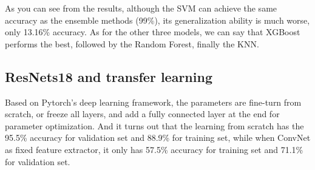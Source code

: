 \documentclass[11pt]{article}
\begin{document}
\begin{table}[h]
\centering
{}
\caption{Four models comparison}
\end{table}

As you can see from the results, although the SVM can achieve the same accuracy as the ensemble methods (99\%), its generalization ability is much worse, only 13.16\% accuracy. As for the other three models, we can say that XGBoost performs the best, followed by the Random Forest, finally the KNN. 
    
\subsection{ResNets18 and transfer learning}
Based on Pytorch's deep learning framework, the parameters are fine-turn from scratch, or freeze all layers, and add a fully connected layer at the end for parameter optimization. And it turns out that the learning from scratch has the 95.5\% accuracy for validation set and 88.9\% for training set, while when ConvNet as fixed feature extractor, it only has 57.5\% accuracy for training set and 71.1\% for validation set.
\end{document}
